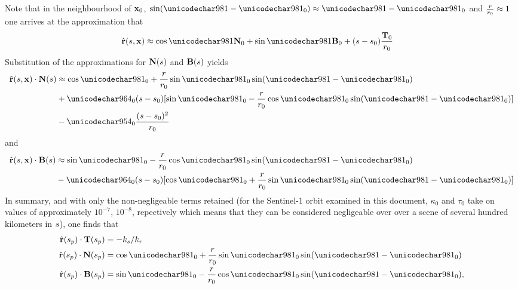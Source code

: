 Note that in the neighbourhood of $\mathbf{x}_0$, $\sin(\targetdepression-\targetdepressionz)\approx\targetdepression-\targetdepressionz$ and $\frac{r}{r_0}\approx 1$ one arrives at the approximation that
\begin{equation}
\begin{split}
 \uRangeVectorParm &\approx \cos\targetdepression\vct{N}_0 + \sin\targetdepression\vct{B}_0 + (\parm-\parm_0)\frac{\vct{T}_0}{\targetrangez}
 \end{split}
\end{equation}
Substitution of the approximations for $\mathbf{N}(s)$ and $\mathbf{B}(s)$ yields
\begin{equation}
\begin{split}
 \uRangeVectorParm\cdot\vct{N}(\parm)&\approx\cos\targetdepressionz + \frac{\targetrange}{\targetrangez}\sin\targetdepressionz\sin(\targetdepression-\targetdepressionz)\\
 &+ \tau_0(\parm-\parm_0)[\sin\targetdepressionz - \frac{\targetrange}{\targetrangez}\cos\targetdepressionz\sin(\targetdepression-\targetdepressionz)]\\
 &-\kappa_0\frac{(\parm-\parm_0)^2}{\targetrangez}
\end{split}
 \end{equation}
and
\begin{equation}
\begin{split}
 \uRangeVectorParm\cdot\vct{B}(\parm)&\approx\sin\targetdepressionz - \frac{\targetrange}{\targetrangez}\cos\targetdepressionz\sin(\targetdepression-\targetdepressionz)\\
 &- \tau_0(\parm-\parm_0)[\cos\targetdepressionz + \frac{\targetrange}{\targetrangez}\sin\targetdepressionz\sin(\targetdepression-\targetdepressionz)]
\end{split}
\end{equation} 
In summary, and with only the non-negligeable terms retained (for the Sentinel-1 orbit examined in this document, $\kappa_0$ and $\tau_0$ take on values of approximately $10^{-7}$, $10^{-8}$, repectively which means that they can be considered negligeable over over a scene of several hundred kilometers in $s$), one finds that
\begin{align}
 \vhat{\range}(\stationaryparm)\cdot\vct{T}(\stationaryparm) &= -\kparm/\kr\label{eq:ender}\\
 \vhat{\range}(\stationaryparm)\cdot\vct{N}(\stationaryparm) &= \cos\targetdepressionz + \frac{\targetrange}{\targetrangez}\sin\targetdepressionz\sin(\targetdepression-\targetdepressionz)\label{eq:cos}\\
 \vhat{\range}(\stationaryparm)\cdot\vct{B}(\stationaryparm) &= \sin\targetdepressionz - \frac{\targetrange}{\targetrangez}\cos\targetdepressionz\sin(\targetdepression-\targetdepressionz),\label{eq:sin}
\end{align}
